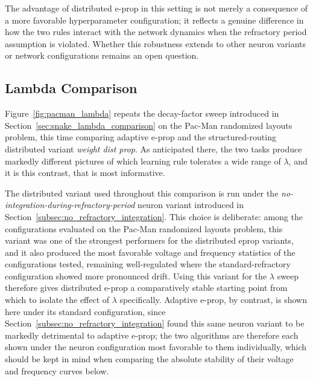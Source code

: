 The advantage of distributed e-prop in this setting is not merely a
consequence of a more favorable hyperparameter configuration; it reflects
a genuine difference in how the two rules interact with the network
dynamics when the refractory period assumption is violated. Whether this
robustness extends to other neuron variants or network configurations
remains an open question.

\subsection{Lambda Comparison}
\label{subsec:pacman_lambda_comparison}

Figure~\ref{fig:pacman_lambda} repeats the decay-factor sweep introduced in
Section~\ref{sec:snake_lambda_comparison} on the Pac-Man randomized layouts
problem, this time comparing adaptive e-prop and the structured-routing
distributed variant \emph{weight dist prop}. As anticipated there, the
two tasks produce markedly different pictures of which learning rule
tolerates a wide range of $\lambda$, and it is this contrast, that is most informative.

The distributed variant used throughout this comparison is run under the
\emph{no-integration-during-refractory-period} neuron variant introduced in
Section~\ref{subsec:no_refractory_integration}. This choice is
deliberate: among the configurations evaluated on the Pac-Man randomized
layouts problem, this variant was one of the strongest performers for 
the distributed eprop variants, and it also produced the most favorable
voltage and frequency statistics of the configurations tested, remaining
well-regulated where the standard-refractory configuration showed more
pronounced drift. Using this variant for the $\lambda$ sweep therefore
gives distributed e-prop a comparatively stable starting point from which
to isolate the effect of $\lambda$ specifically. Adaptive
e-prop, by contrast, is shown here under its standard configuration, since
Section~\ref{subsec:no_refractory_integration} found this same neuron variant
to be markedly detrimental to adaptive e-prop; the
two algorithms are therefore each shown under the neuron configuration
most favorable to them individually, which should be kept in mind when
comparing the absolute stability of their voltage and frequency curves
below.

